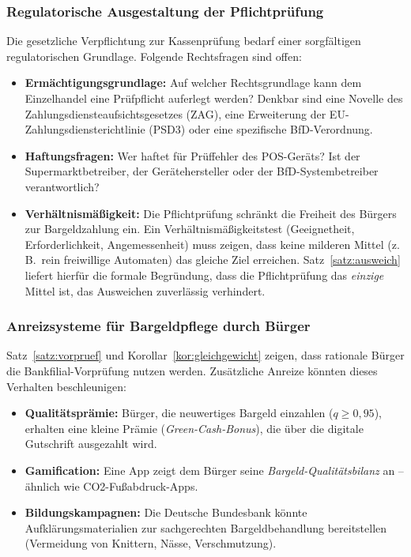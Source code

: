 ﻿\documentclass[a4paper,12pt]{article}
\theoremstyle{definition}
\begin{document}
\subsubsection{Regulatorische Ausgestaltung der Pflichtprüfung}

Die gesetzliche Verpflichtung zur Kassenprüfung bedarf einer sorgfältigen
regulatorischen Grundlage.  Folgende Rechtsfragen sind offen:
\begin{itemize}
  \item \textbf{Ermächtigungsgrundlage:}
        Auf welcher Rechtsgrundlage kann dem Einzelhandel eine Prüfpflicht
        auferlegt werden?  Denkbar sind eine Novelle des Zahlungsdiensteaufsichtsgesetzes
        (ZAG), eine Erweiterung der EU-Zahlungsdiensterichtlinie (PSD3) oder
        eine spezifische BfD-Verordnung.
  \item \textbf{Haftungsfragen:}
        Wer haftet für Prüffehler des POS-Geräts?  Ist der Supermarktbetreiber,
        der Gerätehersteller oder der BfD-Systembetreiber verantwortlich?
  \item \textbf{Verhältnismäßigkeit:}
        Die Pflichtprüfung schränkt die Freiheit des Bürgers zur Bargeldzahlung ein.
        Ein Verhältnismäßigkeitstest (Geeignetheit, Erforderlichkeit,
        Angemessenheit) muss zeigen, dass keine milderen Mittel
        (z.\,B.\ rein freiwillige Automaten) das gleiche Ziel erreichen.
        Satz~\ref{satz:ausweich} liefert hierfür die formale Begründung,
        dass die Pflichtprüfung das \emph{einzige} Mittel ist, das
        Ausweichen zuverlässig verhindert.
\end{itemize}

\subsubsection{Anreizsysteme für Bargeldpflege durch Bürger}

Satz~\ref{satz:vorpruef} und Korollar~\ref{kor:gleichgewicht} zeigen,
dass rationale Bürger die Bankfilial-Vorprüfung nutzen werden.
Zusätzliche Anreize könnten dieses Verhalten beschleunigen:
\begin{itemize}
  \item \textbf{Qualitätsprämie:} Bürger, die neuwertiges Bargeld einzahlen
        ($q \geq 0{,}95$), erhalten eine kleine Prämie (\emph{Green-Cash-Bonus}),
        die über die digitale Gutschrift ausgezahlt wird.
  \item \textbf{Gamification:} Eine App zeigt dem Bürger seine
        \emph{Bargeld-Qualitätsbilanz} an -- ähnlich wie CO2-Fußabdruck-Apps.
  \item \textbf{Bildungskampagnen:} Die Deutsche Bundesbank könnte
        Aufklärungsmaterialien zur sachgerechten Bargeldbehandlung bereitstellen
        (Vermeidung von Knittern, Nässe, Verschmutzung).
\end{itemize}
\end{document}
